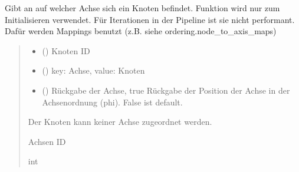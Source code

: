 \documentclass[a4paper,10pt,ngerman]{sphinxmanual}
\begin{document}

\begin{fulllineitems}
\label{\detokenize{api:src.ordering.node_to_axis}}
\pysigstartsignatures
\pysiglinewithargsret
{}
{\sphinxparamcomma {}\sphinxparamcomma {}}
{}
\pysigstopsignatures
\sphinxAtStartPar
Gibt an auf welcher Achse sich ein Knoten befindet. Funktion wird nur zum Initialisieren verwendet. Für Iterationen in der Pipeline ist sie nicht performant. Dafür werden Mappings benutzt (z.B. siehe ordering.node\_to\_axis\_maps)
\begin{quote}\begin{description}
\begin{itemize}
\item {} 
\sphinxAtStartPar
{} () \textendash{} Knoten ID

\item {} 
\sphinxAtStartPar
{} () \textendash{} key: Achse, value: Knoten

\item {} 
\sphinxAtStartPar
{} () \textendash{} Rückgabe der Achse, true Rückgabe der Position der Achse in der Achsenordnung (phi). False ist default.

\end{itemize}

\sphinxAtStartPar
{} \textendash{} Der Knoten kann keiner Achse zugeordnet werden.

\sphinxAtStartPar
Achsen ID

\sphinxAtStartPar
int

\end{description}\end{quote}

\end{fulllineitems}
\end{document}
